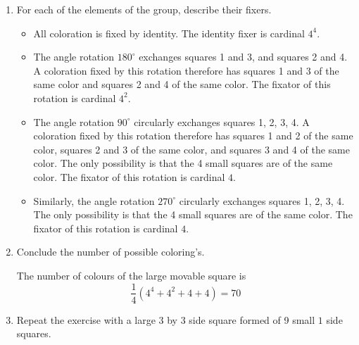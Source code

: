 \documentclass[a4paper,11pt]{exam}
\begin{document}
\begin{questions}
\begin{enumerate}[resume]
	\item For each of the elements of the group, describe their fixers.
	\begin{solution}
		\begin{itemize}
			\item All coloration is fixed by identity.
			The identity fixer is cardinal $4^4$.
			\item The angle rotation $180^\circ$ exchanges squares 1 and 3, and squares 2 and 4.
			A coloration fixed by this rotation therefore has squares 1 and 3 of the same color and squares 2 and 4 of the same color.
			The fixator of this rotation is cardinal $4^2$.
			\item The angle rotation $90^\circ$ circularly exchanges squares 1, 2, 3, 4.
			A coloration fixed by this rotation therefore has squares 1 and 2 of the same color, squares 2 and 3 of the same color, and squares 3 and 4 of the same color.
			The only possibility is that the 4 small squares are of the same color.
			The fixator of this rotation is cardinal $4$.
			\item Similarly, the angle rotation $270^\circ$ circularly exchanges squares 1, 2, 3, 4.
			The only possibility is that the 4 small squares are of the same color.
			The fixator of this rotation is cardinal $4$.
		\end{itemize}
	\end{solution}
	\item Conclude the number of possible coloring's.
	
	\begin{solution}
		The number of colours of the large movable square is
		\[
		\frac{1}{4}(4^4+4^2+4+4)=70
		\]
	\end{solution}
	
	\item Repeat the exercise with a large $3$ by $3$ side square formed of 9 small $1$ side squares.
	

\end{enumerate}
\end{questions}
\end{document}
